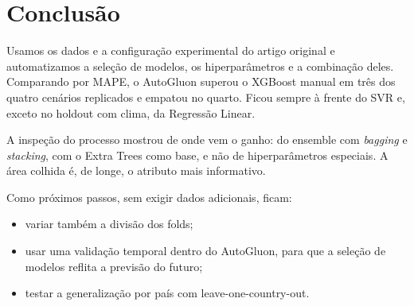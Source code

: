 \documentclass[a4paper,11pt]{article}
\begin{document}
\section{Conclusão}

Usamos os dados e a configuração experimental do artigo original e automatizamos a seleção
de modelos, os hiperparâmetros e a combinação deles. Comparando por MAPE, o AutoGluon
superou o XGBoost manual em três dos quatro cenários replicados e empatou no quarto. Ficou
sempre à frente do SVR e, exceto no holdout com clima, da Regressão Linear.

A inspeção do processo mostrou de onde vem o ganho: do ensemble com \textit{bagging} e
\textit{stacking}, com o Extra Trees como base, e não de hiperparâmetros especiais. A área
colhida é, de longe, o atributo mais informativo.

Como próximos passos, sem exigir dados adicionais, ficam:
\begin{itemize}
  \item variar também a divisão dos folds;
  \item usar uma validação temporal dentro do AutoGluon, para que a seleção de modelos
  reflita a previsão do futuro;
  \item testar a generalização por país com leave-one-country-out.
\end{itemize}



\end{document}

